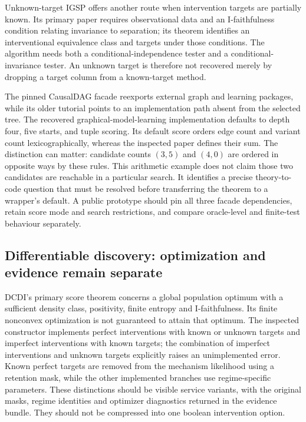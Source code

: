 Unknown-target IGSP offers another route when intervention targets are
partially known. Its primary paper requires observational data and an
I-faithfulness condition relating invariance to separation; its theorem
identifies an interventional equivalence class and targets under those
conditions. The algorithm needs both a conditional-independence tester and
a conditional-invariance tester. An unknown target is therefore not
recovered merely by dropping a target column from a known-target method.
\citep{exec14_pt_paper_utigsp}

The pinned CausalDAG facade reexports external graph and learning packages,
while its older tutorial points to an implementation path absent from the
selected tree. The recovered graphical-model-learning implementation
defaults to depth four, five starts, and tuple scoring. Its default score
orders edge count and variant count lexicographically, whereas the
inspected paper defines their sum. The distinction can matter: candidate
counts $(3,5)$ and $(4,0)$ are ordered in opposite ways by these rules.
This arithmetic example does not claim those two candidates are reachable
in a particular search. It identifies a precise theory-to-code question
that must be resolved before transferring the theorem to a wrapper's
default. A public prototype should pin all three facade dependencies,
retain score mode and search restrictions, and compare oracle-level and
finite-test behaviour separately. \citep{exec14_pt_causaldag,exec14_pt_gml,
exec14_pt_paper_utigsp,exec14_pt_exact}

\subsection{Differentiable discovery: optimization and evidence remain separate}

DCDI's primary score theorem concerns a global population optimum with a
sufficient density class, positivity, finite entropy and I-faithfulness.
Its finite nonconvex optimization is not guaranteed to attain that optimum.
The inspected constructor implements perfect interventions with known or
unknown targets and imperfect interventions with known targets; the
combination of imperfect interventions and unknown targets explicitly raises an unimplemented error.
Known perfect targets are removed from the mechanism likelihood using a
retention mask, while the other implemented branches use regime-specific
parameters. These distinctions should be visible service variants, with
the original masks, regime identities and optimizer diagnostics returned
in the evidence bundle. They should not be compressed into one boolean
intervention option. \citep{exec14_pt_paper_dcdi,exec14_pt_dcdi}


